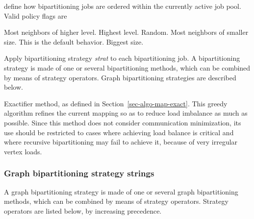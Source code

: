 \begin{itemize}
\begin{itemize}
define how bipartitioning jobs are ordered within the currently active job
pool. Valid policy flags are
\begin{itemize}
\iteme[{\tt L}]
Most neighbors of higher level.
\iteme[{\tt l}]
Highest level.
\iteme[{\tt r}]
Random.
\iteme[{\tt S}]
Most neighbors of smaller size. This is the default behavior.
\iteme[{\tt s}]
Biggest size.
\end{itemize}
\iteme[{\tt sep=}{\it strat}]
Apply bipartitioning strategy {\it strat\/} to each bipartitioning job.
A bipartitioning strategy is made of one or several bipartitioning methods,
which can be combined by means of strategy operators. Graph
bipartitioning strategies are described below.
\end{itemize}
\iteme[{\tt x}]
Exactifier method, as defined in Section~\ref{sec-algo-map-exact}.
This greedy algorithm refines the current mapping so as to reduce load
imbalance as much as possible. Since this method does not consider
communication minimization, its use should be restricted to cases
where achieving load balance is critical and where recursive
bipartitioning may fail to achieve it, because of very irregular
vertex loads.
\end{itemize}

\subsubsection{Graph bipartitioning strategy strings}
\label{sec-lib-format-strat-bipart}

A graph bipartitioning strategy is made of one or several graph
bipartitioning methods, which can be combined by means of strategy
operators. Strategy operators are listed below, by increasing
precedence.

